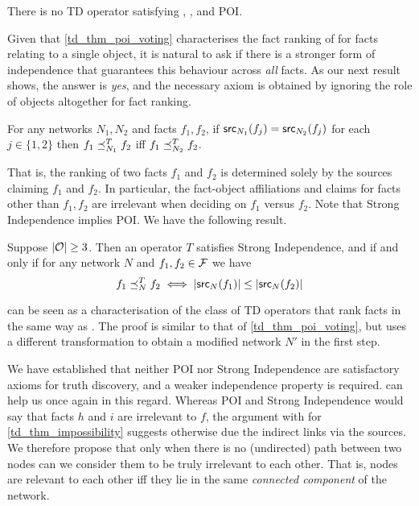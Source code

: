 \begin{theorem}
\label{td_thm_impossibility}
    There is no TD operator satisfying \coherence{}, \symmetry{},
    \monotonicity{} and POI.
\end{theorem}

Given that \cref{td_thm_poi_voting} characterises the fact ranking of
\voting{} for facts relating to a single object, it is natural to ask if there
is a stronger form of independence that guarantees this behaviour across
\emph{all} facts. As our next result shows, the answer is \emph{yes}, and the
necessary axiom is obtained by ignoring the role of objects altogether for fact
ranking.

\begin{axiom}
For any networks $N_1, N_2$ and facts $f_1, f_2$, if $\mathsf{src}_{N_1}(f_j) =
\mathsf{src}_{N_2}(f_j)$ for each $j \in \{1, 2\}$ then $f_1 \preceq_{N_1}^T f_2$ iff
$f_1 \preceq_{N_2}^T f_2$.
\end{axiom}

That is, the ranking of two facts $f_1$ and $f_2$ is determined solely by the
sources claiming $f_1$ and $f_2$. In particular, the fact-object affiliations
and claims for facts other than $f_1, f_2$ are irrelevant when deciding on
$f_1$ versus $f_2$. Note that Strong Independence implies POI.
%
We have the following result.

\begin{theorem}
\label{td_thm_voting_characterisation}
Suppose $|\mathcal{O}| \ge 3$. Then an operator $T$ satisfies Strong Independence,
    \monotonicity{} and \symmetry{} if and only if for any network $N$ and $f_1, f_2 \in
\mathcal{F}$ we have
\[
    f_1 \preceq_N^T f_2 \iff |\mathsf{src}_N(f_1)| \le |\mathsf{src}_N(f_2)|
\]
\end{theorem}

 can be seen as a characterisation of the
class of TD operators that rank facts in the same way as \voting{}. The proof
is similar to that of \cref{td_thm_poi_voting}, but uses a different
transformation to obtain a modified network $N'$ in the first step.

We have established that neither POI nor Strong Independence are satisfactory
axioms for truth discovery, and a weaker independence property is required.
 can help us once again in this regard. Whereas POI and
Strong Independence would say that facts $h$ and $i$ are irrelevant to $f$, the
argument with \coherence{} for \cref{td_thm_impossibility} suggests otherwise due the
indirect links via the sources. We therefore propose that only when there is no
(undirected) path between two nodes can we consider them to be truly irrelevant
to each other. That is, nodes are relevant to each other iff they lie in the
same \emph{connected component} of the network.

